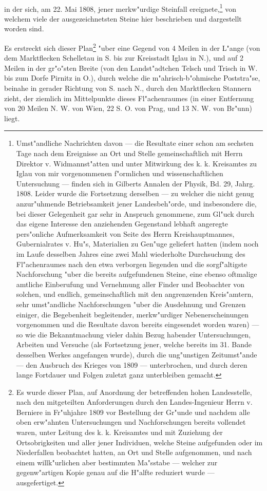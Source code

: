 \documentclass[a4paper, 11pt, oneside, german]{article}
\begin{document}
\paragraph{}
in der sich, am 22. Mai 1808, jener merkw"urdige Steinfall ereignete,\footnote{Umst"andliche Nachrichten davon --- die Resultate einer schon am sechsten Tage nach dem Ereignisse an Ort und Stelle gemeinschaftlich mit Herrn Direktor v. Widmannst"atten und unter Mitwirkung des k. k. Kreisamtes zu Iglau von mir vorgenommenen f"ormlichen und wissenschaftlichen Untersuchung --- finden sich in Gilberts Annalen der Physik, Bd. 29, Jahrg. 1808. Leider wurde die Fortsetzung derselben --- zu welcher die nicht genug anzur"uhmende Betriebsamkeit jener Landesbeh"orde, und insbesondere die, bei dieser Gelegenheit gar sehr in Anspruch genommene, zum Gl"uck durch das eigene Interesse den anziehenden Gegenstand lebhaft angeregte pers"onliche Aufmerksamkeit von Seite des Herrn Kreishauptmannes, Gubernialrates v. Hu"s, Materialien zu Gen"uge geliefert hatten (indem noch im Laufe desselben Jahres eine zwei Mahl wiederholte Durchsuchung des Fl"achenraumes nach den etwa verborgen liegenden und die sorgf"altigste Nachforschung "uber die bereits aufgefundenen Steine, eine ebenso oftmalige amtliche Einberufung und Vernehmung aller Finder und Beobachter von solchen, und endlich, gemeinschaftlich mit den angrenzenden Kreis"amtern, sehr umst"andliche Nachforschungen "uber die Ausdehnung und Grenzen einiger, die Begebenheit begleitender, merkw"urdiger Nebenerscheinungen vorgenommen und die Resultate davon bereits eingesendet worden waren) --- so wie die Bekanntmachung vieler dahin Bezug habender Untersuchungen, Arbeiten und Versuche (als Fortsetzung jener, welche bereits im 31. Bande desselben Werkes angefangen wurde), durch die ung"unstigen Zeitumst"ande --- den Ausbruch des Krieges von 1809 --- unterbrochen, und durch deren lange Fortdauer und Folgen zuletzt ganz unterbleiben gemacht.} von welchem viele der ausgezeichnetsten Steine hier beschrieben und dargestellt worden sind.

Es erstreckt sich dieser Plan\footnote{Es wurde dieser Plan, auf Anordnung der betreffenden hohen Landesstelle, nach den mitgeteilten Anforderungen durch den Landes-Ingenieur Herrn v. Berniere in Fr"uhjahre 1809 vor Bestellung der Gr"unde und nachdem alle oben erw"ahnten Untersuchungen und Nachforschungen bereits vollendet waren, unter Leitung des k. k. Kreisamtes und mit Zuziehung der Ortsobrigkeiten und aller jener Individuen, welche Steine aufgefunden oder im Niederfallen beobachtet hatten, an Ort und Stelle aufgenommen, und nach einem willk"urlichen aber bestimmten Ma"sstabe --- welcher zur gegenw"artigen Kopie genau auf die H"alfte reduziert wurde --- ausgefertiget.} "uber eine Gegend von 4 Meilen in der L"ange (von dem Marktflecken Schelletau in S. bis zur Kreisstadt Iglau in N.), und auf 2 Meilen in der gr"o"sten Breite (von den Landst"adtchen Telsch und Trisch in W. bis zum Dorfe Pirnitz in O.), durch welche die m"ahrisch-b"ohmische Poststra"se, beinahe in gerader Richtung von S. nach N., durch den Marktflecken Stannern zieht, der ziemlich im Mittelpunkte dieses Fl"achenraumes (in einer Entfernung von 20 Meilen N. W. von Wien, 22 S. O. von Prag, und 13 N. W. von Br"unn) liegt.
\end{document}
